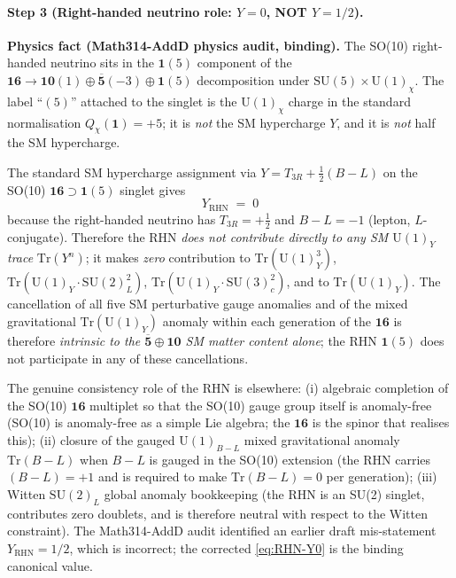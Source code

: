 \paragraph{Step 3 (Right-handed neutrino role: $Y=0$, NOT $Y=1/2$).}
\textbf{Physics fact (Math314-AddD physics audit, binding).} The
SO(10) right-handed neutrino sits in the $\mathbf{1}(5)$ component
of the
$\mathbf{16} \to \mathbf{10}(1) \oplus \overline{\mathbf{5}}(-3)
\oplus \mathbf{1}(5)$ decomposition under $\mathrm{SU}(5)\times
\mathrm{U}(1)_\chi$. The label ``$(5)$'' attached to the singlet is
the $\mathrm{U}(1)_\chi$ charge in the standard normalisation
$Q_\chi(\mathbf{1}) = +5$; it is \emph{not} the SM hypercharge $Y$,
and it is \emph{not} half the SM hypercharge.

The standard SM hypercharge assignment via
$Y = T_{3R} + \tfrac{1}{2}(B-L)$ on the SO(10)
$\mathbf{16}\supset\mathbf{1}(5)$ singlet gives
\begin{equation}\label{eq:RHN-Y0}
  \boxed{\;
    Y_{\mathrm{RHN}} \;=\; 0
  \;}
\end{equation}
because the right-handed neutrino has $T_{3R} = +\tfrac{1}{2}$ and
$B-L = -1$ (lepton, $L$-conjugate). Therefore the RHN \emph{does not
contribute directly to any SM $\mathrm{U}(1)_Y$ trace}
$\mathrm{Tr}(Y^n)$; it makes \emph{zero} contribution to
$\mathrm{Tr}(\mathrm{U}(1)_Y^3)$,
$\mathrm{Tr}(\mathrm{U}(1)_Y\cdot\mathrm{SU}(2)_L^2)$,
$\mathrm{Tr}(\mathrm{U}(1)_Y\cdot\mathrm{SU}(3)_c^2)$,
and to $\mathrm{Tr}(\mathrm{U}(1)_Y)$. The cancellation of all five
SM perturbative gauge anomalies and of the mixed gravitational
$\mathrm{Tr}(\mathrm{U}(1)_Y)$ anomaly within each generation of the
$\mathbf{16}$ is therefore \emph{intrinsic to the
$\overline{\mathbf{5}}\oplus\mathbf{10}$ SM matter content alone};
the RHN $\mathbf{1}(5)$ does not participate in any of these
cancellations.

The genuine consistency role of the RHN is elsewhere:
(i) algebraic completion of the SO(10) $\mathbf{16}$ multiplet so
that the SO(10) gauge group itself is anomaly-free (SO(10) is
anomaly-free as a simple Lie algebra; the $\mathbf{16}$ is the
spinor that realises this);
(ii) closure of the gauged $\mathrm{U}(1)_{B-L}$ mixed gravitational
anomaly $\mathrm{Tr}(B-L)$ when $B-L$ is gauged in the SO(10)
extension (the RHN carries $(B-L) = +1$ and is required to make
$\mathrm{Tr}(B-L) = 0$ per generation);
(iii) Witten $\mathrm{SU}(2)_L$ global anomaly bookkeeping (the RHN
is an SU(2) singlet, contributes zero doublets, and is therefore
neutral with respect to the Witten constraint).
The Math314-AddD audit identified an earlier draft mis-statement
$Y_{\mathrm{RHN}} = 1/2$, which is incorrect; the corrected
\eqref{eq:RHN-Y0} is the binding canonical value.

